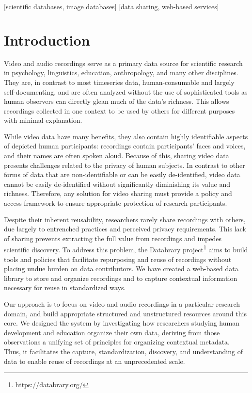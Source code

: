\documentclass{sig-alternate}
\begin{document}
[scientific databases, image databases]
[data sharing, web-based services]



\break
\section{Introduction}

Video and audio recordings serve as a primary data source for scientific research in psychology, linguistics, education, anthropology, and many other disciplines.
They are, in contrast to most timeseries data, human-consumable and largely self-documenting, and are often analyzed without the use of sophisticated tools as human observers can directly glean much of the data's richness.
This allows recordings collected in one context to be used by others for different purposes with minimal explanation.

While video data have many benefits, they also contain highly identifiable aspects of depicted human participants: recordings contain participants' faces and voices, and their names are often spoken aloud.
Because of this, sharing video data presents challenges related to the privacy of human subjects.
In contrast to other forms of data that are non-identifiable or can be easily de-identified, video data cannot be easily de-identified without significantly diminishing its value and richness. 
Therefore, any solution for video sharing must provide a policy and access framework to ensure appropriate protection of research participants.

Despite their inherent reusability, researchers rarely share recordings with others, due largely to entrenched practices and perceived privacy requirements.
This lack of sharing prevents extracting the full value from recordings and impedes scientific discovery.
To address this problem, the Databrary project\footnote{https://databrary.org/} aims to build tools and policies that facilitate repurposing and reuse of recordings without placing undue burden on data contributors.
We have created a web-based data library to store and organize recordings and to capture contextual information necessary for reuse in standardized ways.

Our approach is to focus on video and audio recordings in a particular research domain, and build appropriate structured and unstructured resources around this core.
We designed the system by investigating how researchers studying human development and education organize their own data, deriving from those observations a unifying set of principles for organizing contextual metadata.
Thus, it facilitates the capture, standardization, discovery, and understanding of data to enable reuse of recordings at an unprecedented scale.
\end{document}
